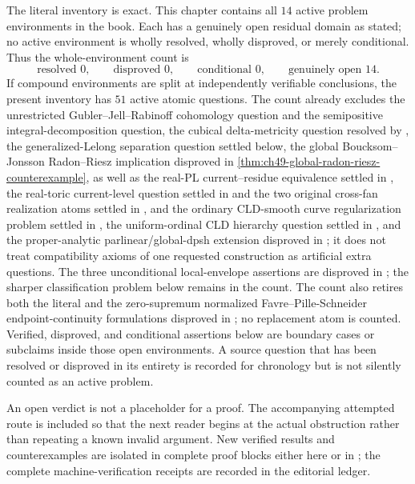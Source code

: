 The literal inventory is exact.  This chapter contains all \(14\) active
problem environments in the book.  Each has a genuinely open residual
domain as stated; no active environment is wholly resolved, wholly
disproved, or merely conditional.  Thus the whole-environment count is
\[
 \text{resolved }0,\qquad
 \text{disproved }0,\qquad
 \text{conditional }0,\qquad
 \text{genuinely open }14.
\]
If compound environments are split at independently verifiable conclusions,
the present inventory has \(51\) active atomic questions.  The count already
excludes the unrestricted Gubler--Jell--Rabinoff cohomology question and the
semipositive integral-decomposition question, the cubical
delta-metricity question resolved by
, the generalized-Lelong
separation question settled below, the global
Boucksom--Jonsson Radon--Riesz implication disproved in
\cref{thm:ch49-global-radon-riesz-counterexample}, as well as the
real-PL current--residue equivalence settled in
, the real-toric
current-level question settled in
 and the two original cross-fan realization
atoms settled in
,
and the ordinary CLD-smooth curve regularization problem settled in
, the uniform-ordinal
CLD hierarchy question settled in
, and the proper-analytic
parlinear/global-dpsh extension disproved in
; it does not treat
compatibility axioms of one requested construction as artificial extra
questions.
The three unconditional local-envelope assertions are disproved in
; the sharper classification problem
below remains in the count.
The count also retires both the literal and the zero-supremum normalized
Favre--Pille-Schneider endpoint-continuity formulations disproved in
; no replacement atom
is counted.
Verified, disproved, and conditional assertions below are boundary cases or
subclaims inside those open environments.  A source question that has been
resolved or disproved in its entirety is recorded for chronology but is not
silently counted as an active problem.

An open verdict is not a placeholder for a proof.  The accompanying attempted
route is included so that the next reader begins at the actual obstruction
rather than repeating a known invalid argument.  New verified results and
counterexamples are isolated in complete proof blocks either here or in
; the complete machine-verification receipts
are recorded in the editorial ledger.

